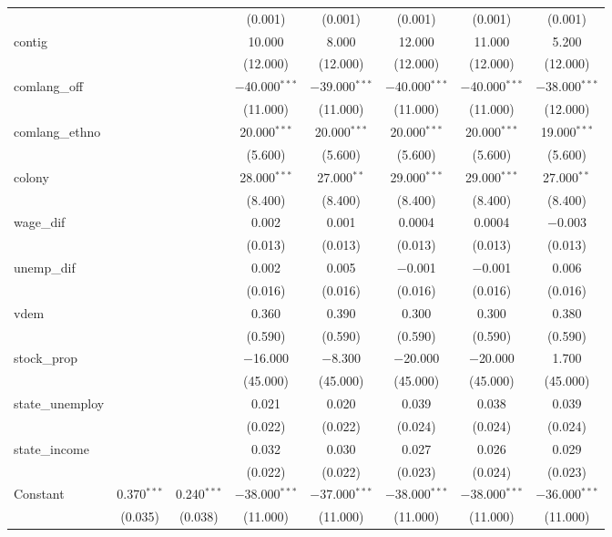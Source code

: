 \documentclass[
  11pt,
]{article}
\begin{document}
\begin{table}[!htbp]
\begin{tabular}{@{\extracolsep{2pt}}lccccccc}
  &  &  & (0.001) & (0.001) & (0.001) & (0.001) & (0.001) \\ 
  contig &  &  & 10.000 & 8.000 & 12.000 & 11.000 & 5.200 \\ 
  &  &  & (12.000) & (12.000) & (12.000) & (12.000) & (12.000) \\ 
  comlang\_off &  &  & $-$40.000$^{***}$ & $-$39.000$^{***}$ & $-$40.000$^{***}$ & $-$40.000$^{***}$ & $-$38.000$^{***}$ \\ 
  &  &  & (11.000) & (11.000) & (11.000) & (11.000) & (12.000) \\ 
  comlang\_ethno &  &  & 20.000$^{***}$ & 20.000$^{***}$ & 20.000$^{***}$ & 20.000$^{***}$ & 19.000$^{***}$ \\ 
  &  &  & (5.600) & (5.600) & (5.600) & (5.600) & (5.600) \\ 
  colony &  &  & 28.000$^{***}$ & 27.000$^{**}$ & 29.000$^{***}$ & 29.000$^{***}$ & 27.000$^{**}$ \\ 
  &  &  & (8.400) & (8.400) & (8.400) & (8.400) & (8.400) \\ 
  wage\_dif &  &  & 0.002 & 0.001 & 0.0004 & 0.0004 & $-$0.003 \\ 
  &  &  & (0.013) & (0.013) & (0.013) & (0.013) & (0.013) \\ 
  unemp\_dif &  &  & 0.002 & 0.005 & $-$0.001 & $-$0.001 & 0.006 \\ 
  &  &  & (0.016) & (0.016) & (0.016) & (0.016) & (0.016) \\ 
  vdem &  &  & 0.360 & 0.390 & 0.300 & 0.300 & 0.380 \\ 
  &  &  & (0.590) & (0.590) & (0.590) & (0.590) & (0.590) \\ 
  stock\_prop &  &  & $-$16.000 & $-$8.300 & $-$20.000 & $-$20.000 & 1.700 \\ 
  &  &  & (45.000) & (45.000) & (45.000) & (45.000) & (45.000) \\ 
  state\_unemploy &  &  & 0.021 & 0.020 & 0.039 & 0.038 & 0.039 \\ 
  &  &  & (0.022) & (0.022) & (0.024) & (0.024) & (0.024) \\ 
  state\_income &  &  & 0.032 & 0.030 & 0.027 & 0.026 & 0.029 \\ 
  &  &  & (0.022) & (0.022) & (0.023) & (0.024) & (0.023) \\ 
  Constant & 0.370$^{***}$ & 0.240$^{***}$ & $-$38.000$^{***}$ & $-$37.000$^{***}$ & $-$38.000$^{***}$ & $-$38.000$^{***}$ & $-$36.000$^{***}$ \\ 
  & (0.035) & (0.038) & (11.000) & (11.000) & (11.000) & (11.000) & (11.000) \\ 

\end{tabular}
\end{table}
\end{document}
